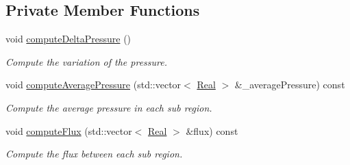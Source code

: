 \subsection*{Private Member Functions}
\begin{DoxyCompactItemize}
\item 
void \hyperlink{classFVCode3D_1_1MSR_afc43a5ff2dc8f0dce321aa3d03b45194}{compute\+Delta\+Pressure} ()
\begin{DoxyCompactList}\small\item\em Compute the variation of the pressure. \end{DoxyCompactList}\item 
void \hyperlink{classFVCode3D_1_1MSR_a6425feaf241a89b4be13bab2e83c8b2e}{compute\+Average\+Pressure} (std\+::vector$<$ \hyperlink{namespaceFVCode3D_a40c1f5588a248569d80aa5f867080e83}{Real} $>$ \&\+\_\+average\+Pressure) const 
\begin{DoxyCompactList}\small\item\em Compute the average pressure in each sub region. \end{DoxyCompactList}\item 
void \hyperlink{classFVCode3D_1_1MSR_ae29570a0d0d6767454ebf70f97e22f47}{compute\+Flux} (std\+::vector$<$ \hyperlink{namespaceFVCode3D_a40c1f5588a248569d80aa5f867080e83}{Real} $>$ \&flux) const 
\begin{DoxyCompactList}\small\item\em Compute the flux between each sub region. \end{DoxyCompactList}\end{DoxyCompactItemize}
